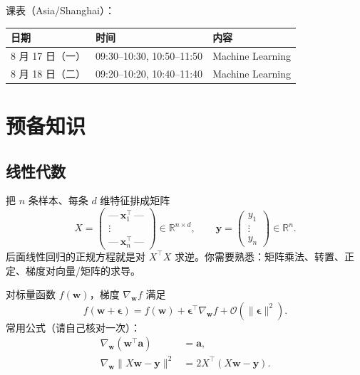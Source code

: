 \documentclass[11pt,a4paper]{article}
\theoremstyle{definition}
\theoremstyle{plain}
\theoremstyle{remark}
\newcommand{\R}{\mathbb{R}}
\begin{document}
课表（Asia/Shanghai）：

\begin{center}
\begin{tabular}{lll}
\toprule
日期 & 时间 & 内容 \\
\midrule
8 月 17 日（一） & 09:30--10:30, 10:50--11:50 & Machine Learning \\
8 月 18 日（二） & 09:20--10:20, 10:40--11:40 & Machine Learning \\
\bottomrule
\end{tabular}
\end{center}

\section{预备知识}
\label{sec:prereq}

\subsection{线性代数}

把 $n$ 条样本、每条 $d$ 维特征排成矩阵
\begin{equation}
  X=\begin{pmatrix}
  \text{---}\, \mathbf{x}_1^\top \,\text{---}\\
  \vdots\\
  \text{---}\, \mathbf{x}_n^\top \,\text{---}
  \end{pmatrix}\in\R^{n\times d},\qquad
  \mathbf{y}=\begin{pmatrix}y_1\\ \vdots\\ y_n\end{pmatrix}\in\R^{n}.
\end{equation}
后面线性回归的正规方程就是对 $X^\top X$ 求逆。你需要熟悉：矩阵乘法、转置、正定、梯度对向量/矩阵的求导。

对标量函数 $f(\mathbf{w})$，梯度 $\nabla_{\mathbf{w}}f$ 满足
\begin{equation}
  f(\mathbf{w}+\boldsymbol{\epsilon})=f(\mathbf{w})+\boldsymbol{\epsilon}^\top\nabla_{\mathbf{w}}f+\mathcal{O}(\|\boldsymbol{\epsilon}\|^2).
\end{equation}
常用公式（请自己核对一次）：
\begin{align}
  \nabla_{\mathbf{w}}(\mathbf{w}^\top\mathbf{a})&=\mathbf{a},\\
  \nabla_{\mathbf{w}}\|X\mathbf{w}-\mathbf{y}\|^2&=2X^\top(X\mathbf{w}-\mathbf{y}).
\end{align}
\end{document}
